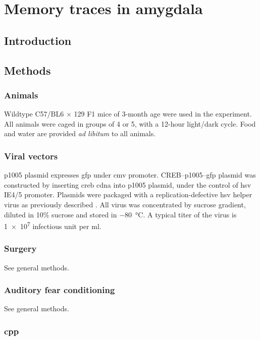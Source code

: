 \chapter{Memory traces in amygdala}

\section{Introduction}

\section{Methods}

\subsection{Animals}
Wildtype C57/BL6 $\times$ 129 F1 mice of 3-month age were used in the experiment. All animals were caged in groups of 4 or 5, with a 12-hour light\slash dark cycle. Food and water are provided \textit{ad libitum} to all animals.

\subsection{Viral vectors}
 p1005 plasmid expresses \gls{gfp} under \gls{cmv} promoter. CREB--p1005--\gls{gfp} plasmid was constructed by inserting \gls{creb} \gls{cdna} into p1005 plasmid, under the control of \gls{hsv} IE4/5 promoter. Plasmids were packaged with a replication-defective \gls{hsv} helper virus as previously described \citep{neve05}. All virus was concentrated by sucrose gradient, diluted in 10\% sucrose and stored in \SI{-80}{\celsius}. A typical titer of the virus is \num{1e7} infectious unit per \si{ml}. 

\subsection{Surgery}
See general methods.

\subsection{Auditory fear conditioning}
See general methods.

\subsection{\Acrlong{cpp}}


